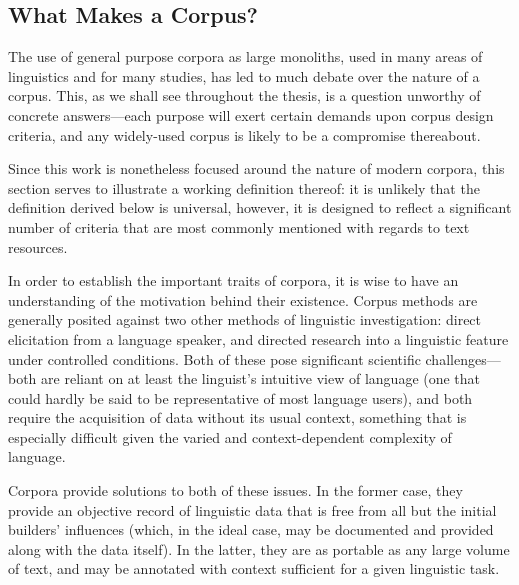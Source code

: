 \subsection{What Makes a Corpus?} %
The use of general purpose corpora as large monoliths, used in many areas of linguistics and for many studies, has led to much debate over the nature of a corpus.  This, as we shall see throughout the thesis, is a question unworthy of concrete answers---each purpose will exert certain demands upon corpus design criteria, and any widely-used corpus is likely to be a compromise thereabout.

Since this work is nonetheless focused around the nature of modern corpora, this section serves to illustrate a working definition thereof: it is unlikely that the definition derived below is universal, however, it is designed to reflect a significant number of criteria that are most commonly mentioned with regards to text resources.




In order to establish the important traits of corpora, it is wise to have an understanding of the motivation behind their existence.  Corpus methods are generally posited against two other methods of linguistic investigation: direct elicitation from a language speaker, and directed research into a linguistic feature under controlled conditions.  Both of these pose significant scientific challenges---both are reliant on at least the linguist's intuitive view of language (one that could hardly be said to be representative of most language users), and both require the acquisition of data without its usual context, something that is especially difficult given the varied and context-dependent complexity of language.

Corpora provide solutions to both of these issues.  In the former case, they provide an objective record of linguistic data that is free from all but the initial builders' influences (which, in the ideal case, may be documented and provided along with the data itself).  In the latter, they are as portable as any large volume of text, and may be annotated with context sufficient for a given linguistic task.


